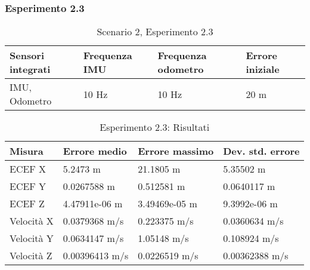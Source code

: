 \subsubsection{Esperimento 2.3}
\begin{table}[h]
	\centering
	\begin{tabular}{|p{3.2cm}|p{2.75cm}|p{2.75cm}|p{2.75cm}|}
		\hline 
		\textbf{Sensori integrati} & \textbf{Frequenza IMU}  & \textbf{Frequenza odometro} & \textbf{Errore iniziale} \\ 
		\hline 
		IMU, Odometro & 10 Hz & 10 Hz & 20 m \\ 
		\hline 
	\end{tabular}
	\caption{Scenario 2, Esperimento 2.3}
\end{table}
\begin{table}[h]
	\centering
	\begin{tabular}{|p{2cm}|p{3.2cm}|p{3cm}|p{3cm}|}
		\hline 
		\textbf{Misura} 
		& \textbf{Errore medio} 
		& \textbf{Errore massimo}
		& \textbf{Dev. std. errore}\\ 
		\hline 
		ECEF X & 5.2473 m & 21.1805 m & 5.35502 m \\ 
		\hline 
		ECEF Y & 0.0267588 m & 0.512581 m & 0.0640117 m \\ 
		\hline 
		ECEF Z & 4.47911e-06 m & 3.49469e-05 m & 9.3992e-06 m \\ 
		\hline 
		Velocit\`a X & 0.0379368 m/s & 0.223375 m/s & 0.0360634 m/s \\ 
		\hline 
		Velocit\`a Y & 0.0634147 m/s & 1.05148 m/s & 0.108924 m/s \\ 
		\hline 
		Velocit\`a Z & 0.00396413 m/s & 0.0226519 m/s & 0.00362388 m/s \\ 
		\hline 
	\end{tabular} 
	\caption{Esperimento 2.3: Risultati}
\end{table}
